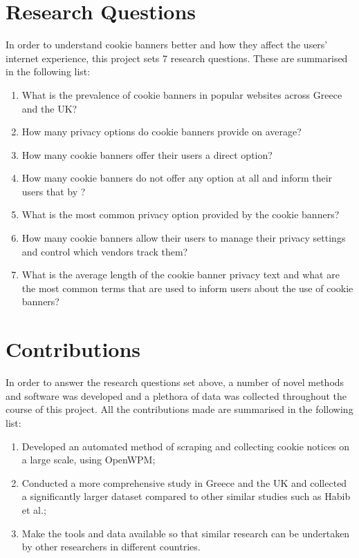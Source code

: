 \documentclass[../main.tex]{subfiles}
\begin{document}
\section{Research Questions}

In order to understand cookie banners better and how they affect the users’ internet experience, this project sets 7 research questions. These are summarised in the following list:

\begin{enumerate}[label=\textbf{RQ\arabic*}:, ref=RQ\arabic*, leftmargin=1.65cm]
    \item \label{rq:prevalence} What is the prevalence of cookie banners in popular websites across Greece and the UK? 
    \item \label{rq:options_avg} How many privacy options do cookie banners provide on average?
    \item \label{rq:direct_opt_out} How many cookie banners offer their users a direct  option?
    \item \label{rq:no_options} How many cookie banners do not offer any option at all and inform their users that by ?
    \item \label{rq:common_ctas} What is the most common privacy option provided by the cookie banners? 
    \item \label{rq:manage_options_count} How many cookie banners allow their users to manage their privacy settings and control which vendors track them?
    \item \label{rq:common_privacy_txt} What is the average length of the cookie banner privacy text and what are the most common terms that are used to inform users about the use of cookie banners?
\end{enumerate}
    
\section{Contributions}

In order to answer the research questions set above, a number of novel methods and software was developed and a plethora of data was collected throughout the course of this project. All the contributions made are summarised in the following list:

\begin{enumerate}
    \item \label{contr_1} Developed an automated method of scraping and collecting cookie notices on a large scale, using OpenWPM;
    \item \label{contr_2} Conducted a more comprehensive study in Greece and the UK and collected a significantly larger dataset compared to other similar studies such as Habib et al.;
    \item \label{contr_3} Make the tools and data available so that similar research can be undertaken by other researchers in different countries.
\end{enumerate}
\end{document}
